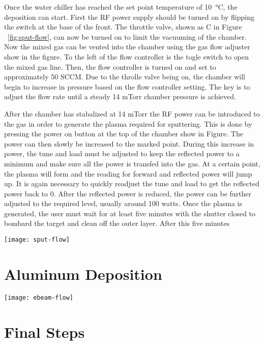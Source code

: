 Once the water chiller has reached the set point temperature of \SI{10}{\celsius}, the deposition can start.
First the RF power supply should be turned on by flipping the switch at the base of the front.
The throttle valve, shown as C in Figure ~\ref{fig:sput-flow}, can now be turned on to limit the vacuuming of the chamber.
Now the mixed gas can be vented into the chamber using the gas flow adjuster show in the figure.
To the left of the flow controller is the togle switch to open the mixed gas line.
Then, the flow controller is turned on and set to approximately 50 SCCM.
Due to the throlle valve being on, the chamber will begin to increase in pressure based on the flow controller setting.
The key is to adjust the flow rate until a steady 14 mTorr chamber pressure is achieved.

After the chamber has stabalized at 14 mTorr the RF power can be introduced to the gas in order to generate the plasma required for sputtering.
This is done by pressing the power on button at the top of the chamber show in Figure.
The power can then slowly be increased to the marked point.
During this increase in power, the tune and load must be adjusted to keep the reflected power to a minimum and make sure all the power is transfed into the gas.
At a certain point, the plasma will form and the reading for forward and reflected power will jump up.
It is again necessary to quickly readjust the tune and load to get the reflected power back to 0.
After the reflected power is reduced, the power can be further adjusted to the required level, usually around 100 watts.
Once the plasma is generated, the user must wait for at least five minutes with the shutter closed to bombard the target and clean off the outer layer.
After this five minutes 
\begin{sidewaysfigure}
\texttt{[image: sput-flow]}
\caption{This is a diagram of the Sputtering machine vacuum and gas system. Each valve is connected to a pressurized air line.}
\label{fig:sput-flow}
\end{sidewaysfigure}%
\section{Aluminum Deposition}

\begin{sidewaysfigure}
\texttt{[image: ebeam-flow]}
\caption{This is a diagram of the of the electron beam machine.It is used to deposit aluminum onto the detector sample.}
\label{fig:ebeam-flow}
\end{sidewaysfigure}%
\section{Final Steps}%
